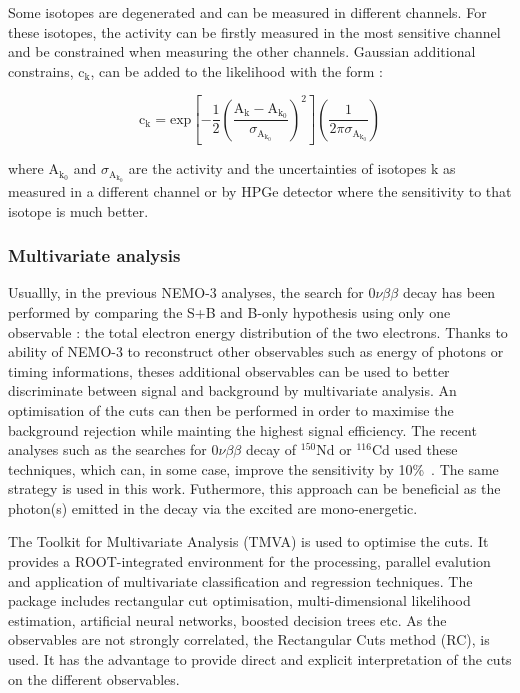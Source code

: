 \documentclass[main.tex]{subfiles}
\begin{document}
\NI Some isotopes are degenerated and can be measured in different channels. For these isotopes, the activity can be firstly measured in the most sensitive channel and be constrained when measuring the other channels. Gaussian additional constrains, c$_\text{k}$, can be added to the likelihood with the form : 

\begin{equation}
\text{c}_\text{k} = \text{exp} \left[ -\frac{\text{1}}{\text{2}} \left( \frac{\text{A}_\text{k} - \text{A}_{\text{k}_\text{0}}}{\sigma_{\text{A}_{\text{k}_\text{0}}}} \right)^\text{2} \right] \left(  \frac{\text{1}}{\text{2}\pi \sigma_{\text{A}_{\text{k}_\text{0}}}} \right) 
\end{equation}


\bigskip


\NI where A$_{\text{k}_\text{0}}$ and $\sigma_{\text{A}_{\text{k}_\text{0}}}$ are the activity and the uncertainties of isotopes k as measured in a different channel or by HPGe detector where the sensitivity to that isotope is much better.


\subsubsection{Multivariate analysis}


\NI Usuallly, in the previous NEMO-3 analyses, the search for 0$\nu\beta\beta$ decay has been performed by comparing the S+B and B-only hypothesis using only one observable : the total electron energy distribution of the two electrons. Thanks to ability of NEMO-3 to reconstruct other observables such as energy of photons or timing informations, theses additional observables can be used to better discriminate between signal and background by multivariate analysis. An optimisation of the cuts can then be performed in order to maximise the background rejection while mainting the highest signal efficiency. The recent analyses such as the searches for 0$\nu\beta\beta$ decay of $^{\text{150}}$Nd or $^{\text{116}}$Cd used these techniques, which can, in some case, improve the sensitivity by 10\%~\cite{NEMO3:Nd150}. The same strategy is used in this work. Futhermore, this approach can be beneficial as the photon(s) emitted in the decay via the excited are mono-energetic.


\bigskip


\NI The Toolkit for Multivariate Analysis (TMVA) is used to optimise the cuts. It provides a ROOT-integrated environment for the processing, parallel evalution and application of multivariate classification and regression techniques. The package includes rectangular cut optimisation, multi-dimensional likelihood estimation, artificial neural networks, boosted decision trees etc. As the observables are not strongly correlated, the Rectangular Cuts method (RC), is used. It has the advantage to provide direct and explicit interpretation of the cuts on the different observables.
\end{document}

